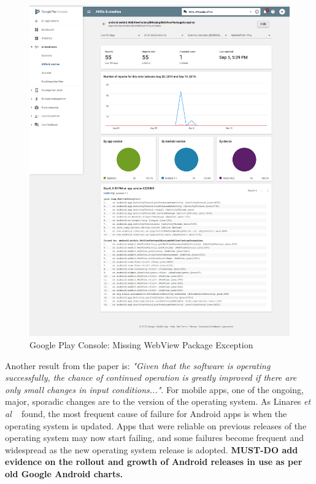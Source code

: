 \begin{figure}[htbp!]
    \centering
    \includegraphics[width=14cm]{images/android-vitals-screenshots/55-crashes-WebViewFactory-MissingWebViewPackageException Screenshot_2019-09-19-kiwix.png}
    \caption{Google Play Console: Missing WebView Package Exception}
    \label{fig:55-crashes-missing-webview-package-exception}
\end{figure}

Another result from the paper is: \emph{"Given that the software is operating successfully, the chance of continued operation is greatly improved if there are only small changes in input conditions..."}. For mobile apps, one of the ongoing, major, sporadic changes are to the version of the operating system. As Linares \emph{et al} ~\cite{linares2013_api_change_and_fault_proneness_android} found, the most frequent cause of failure for Android apps is when the operating system is updated. Apps that were reliable on previous releases of the operating system may now start failing, and some failures become frequent and widespread as the new operating system release is adopted. \textbf{MUST-DO add evidence on the rollout and growth of Android releases in use as per old Google Android charts.}
~

